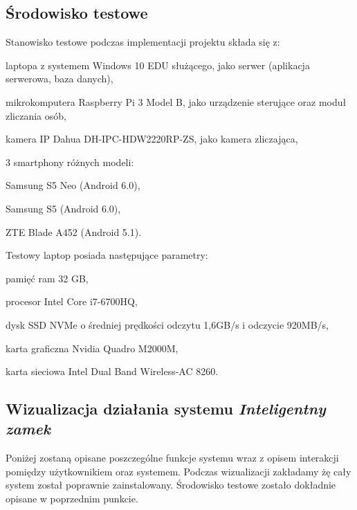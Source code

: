 \documentclass[twoside,10pt]{article}
\def\NazwaSys {\textit{Inteligentny zamek}}
\begin{document}
\subsection{Środowisko testowe}
Stanowisko testowe podczas implementacji projektu składa się z:
\begin{itemize*}
\item laptopa z systemem Windows 10 EDU służącego, jako serwer (aplikacja serwerowa, baza danych),
\item mikrokomputera Raspberry Pi 3 Model B, jako urządzenie sterujące oraz moduł zliczania osób,
\item kamera IP Dahua DH-IPC-HDW2220RP-ZS, jako kamera zliczająca,
\item 3 smartphony różnych modeli:
\begin{enumerate*}
\item Samsung S5 Neo (Android 6.0),
\item Samsung S5 (Android 6.0),
\item ZTE Blade A452 (Android 5.1).
\end{enumerate*}
\end{itemize*}

Testowy laptop posiada następujące parametry:
\begin{itemize*}
\item pamięć ram 32 GB,
\item procesor Intel Core i7-6700HQ,
\item dysk SSD NVMe o średniej prędkości odczytu 1,6GB/s i odczycie 920MB/s,
\item karta graficzna Nvidia Quadro M2000M,
\item karta sieciowa Intel Dual Band Wireless-AC 8260.
\end{itemize*}

\subsection{Wizualizacja działania systemu \textsl{\NazwaSys}}
Poniżej zostaną opisane poszczególne funkcje systemu wraz z opisem interakcji pomiędzy użytkownikiem oraz systemem. Podczas wizualizacji zakładamy żę cały system został poprawnie zainstalowany. Środowisko testowe zostało dokładnie opisane w poprzednim punkcie.
\end{document}
